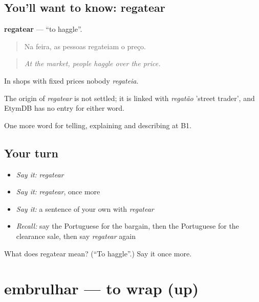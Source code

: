 \subsection*{You'll want to know: regatear}
\textbf{regatear} — \textquotedblleft{}to haggle\textquotedblright{}.

\begin{quote}
Na feira, as pessoas regateiam o preço.
\end{quote}

\begin{quote}
\emph{At the market, people haggle over the price.}
\end{quote}

In shops with fixed prices nobody \emph{regateia}.

\begin{cousinweb}
The origin of \emph{regatear} is not settled; it is linked with \emph{regatão} 'street trader', and EtymDB has no entry for either word.
\end{cousinweb}

\begin{grammarlens}[title={What you've built}]
One more word for telling, explaining and describing at B1.
\end{grammarlens}

\subsection*{Your turn}
\begin{itemize}
\raggedright
  \item \emph{Say it:} \emph{regatear}
  \item \emph{Say it:} \emph{regatear}, once more
  \item \emph{Say it:} a sentence of your own with \emph{regatear}
  \item \emph{Recall:} say the Portuguese for the bargain, then the Portuguese for the clearance sale, then say \emph{regatear} again
\end{itemize}

\begin{tcolorbox}[breakable,colback=teal!4,colframe=teal!35!black,title={Before you move on}]
What does regatear mean? (\textquotedblleft{}To haggle\textquotedblright{}.) Say it once more.
\end{tcolorbox}
\section[embrulhar]{embrulhar — to wrap (up)}

